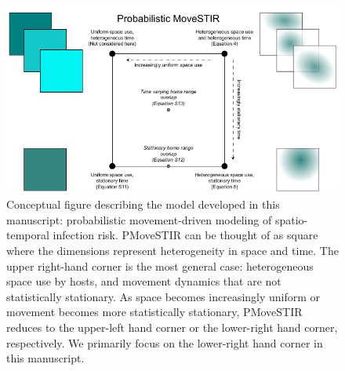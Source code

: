 \documentclass[letterpaper]{article}
\begin{document}
\clearpage

\begin{figure}
    \includegraphics[width=\textwidth]{figures/conceptual_figure_pmovestir_mod.pdf}
    \caption{Conceptual figure describing the model developed in this manuscript: probabilistic movement-driven modeling of spatio-temporal infection risk. PMoveSTIR can be thought of as square where the dimensions represent heterogeneity in space and time. The upper right-hand corner is the most general case: heterogeneous space use by hosts, and movement dynamics that are not statistically stationary.  As space becomes increasingly uniform or movement becomes more statistically stationary, PMoveSTIR reduces to the upper-left hand corner or the lower-right hand corner, respectively.  We primarily focus on the lower-right hand corner in this manuscript.}  %
  \label{fig:square}
\end{figure}
\end{document}
